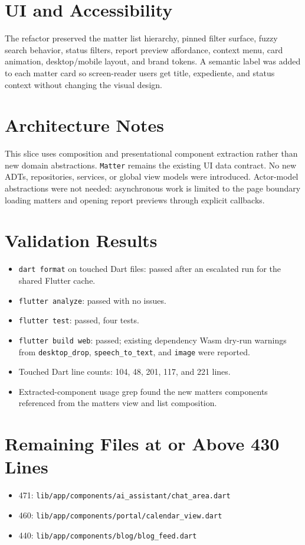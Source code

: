 \documentclass[11pt]{article}
\begin{document}
\section*{UI and Accessibility}
The refactor preserved the matter list hierarchy, pinned filter surface, fuzzy
search behavior, status filters, report preview affordance, context menu,
card animation, desktop/mobile layout, and brand tokens. A semantic label was
added to each matter card so screen-reader users get title, expediente, and
status context without changing the visual design.

\section*{Architecture Notes}
This slice uses composition and presentational component extraction rather than
new domain abstractions. \texttt{Matter} remains the existing UI data contract.
No new ADTs, repositories, services, or global view models were introduced.
Actor-model abstractions were not needed: asynchronous work is limited to the
page boundary loading matters and opening report previews through explicit
callbacks.

\section*{Validation Results}
\begin{itemize}
  \item \texttt{dart format} on touched Dart files: passed after an escalated
  run for the shared Flutter cache.
  \item \texttt{flutter analyze}: passed with no issues.
  \item \texttt{flutter test}: passed, four tests.
  \item \texttt{flutter build web}: passed; existing dependency Wasm dry-run
  warnings from \texttt{desktop\_drop}, \texttt{speech\_to\_text}, and
  \texttt{image} were reported.
  \item Touched Dart line counts: 104, 48, 201, 117, and 221 lines.
  \item Extracted-component usage grep found the new matters components
  referenced from the matters view and list composition.
\end{itemize}

\section*{Remaining Files at or Above 430 Lines}
\begin{itemize}
  \item 471: \texttt{lib/app/components/ai\_assistant/chat\_area.dart}
  \item 460: \texttt{lib/app/components/portal/calendar\_view.dart}
  \item 440: \texttt{lib/app/components/blog/blog\_feed.dart}
\end{itemize}
\end{document}

